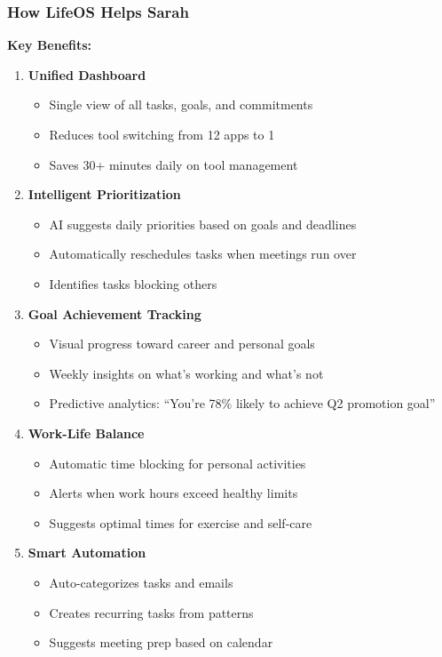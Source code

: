 \subsubsection{How LifeOS Helps Sarah}

\textbf{Key Benefits:}

\begin{enumerate}
    \item \textbf{Unified Dashboard}
    \begin{itemize}
        \item Single view of all tasks, goals, and commitments
        \item Reduces tool switching from 12 apps to 1
        \item Saves 30+ minutes daily on tool management
    \end{itemize}
    
    \item \textbf{Intelligent Prioritization}
    \begin{itemize}
        \item AI suggests daily priorities based on goals and deadlines
        \item Automatically reschedules tasks when meetings run over
        \item Identifies tasks blocking others
    \end{itemize}
    
    \item \textbf{Goal Achievement Tracking}
    \begin{itemize}
        \item Visual progress toward career and personal goals
        \item Weekly insights on what's working and what's not
        \item Predictive analytics: ``You're 78\% likely to achieve Q2 promotion goal''
    \end{itemize}
    
    \item \textbf{Work-Life Balance}
    \begin{itemize}
        \item Automatic time blocking for personal activities
        \item Alerts when work hours exceed healthy limits
        \item Suggests optimal times for exercise and self-care
    \end{itemize}
    
    \item \textbf{Smart Automation}
    \begin{itemize}
        \item Auto-categorizes tasks and emails
        \item Creates recurring tasks from patterns
        \item Suggests meeting prep based on calendar
    \end{itemize}
\end{enumerate}

